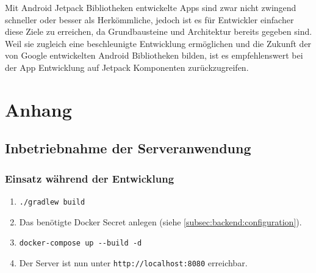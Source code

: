 \documentclass[a4paper, 11pt]{article}
\begin{document}
Mit Android Jetpack Bibliotheken entwickelte Apps sind zwar nicht zwingend schneller oder besser als Herkömmliche, jedoch ist es für Entwickler einfacher diese Ziele zu erreichen, da Grundbausteine und Architektur bereits gegeben sind.
Weil sie zugleich eine beschleunigte Entwicklung ermöglichen und die Zukunft der von Google entwickelten Android Bibliotheken bilden, ist es empfehlenswert bei der App Entwicklung auf Jetpack Komponenten zurückzugreifen.

\newpage
\begingroup
\raggedright
\printbibliography[title={Referenzen}, keyword=citations]
\nocite{*}
\newrefcontext[sorting=nty]
\printbibliography[title={Dokumentationen}, keyword=sources, env=sources]
\endgroup

\newpage
\section*{Anhang}
\label{sec:attachments}

\subsection*{Inbetriebnahme der Serveranwendung}
\label{subsec:attachments:instructions}

\subsubsection*{Einsatz während der Entwicklung}
\label{subsubsec:attachments:instructions:development}
\begin{enumerate}
	\item \verb|./gradlew build|
	\item Das benötigte Docker Secret anlegen (siehe \autoref{subsec:backend:configuration}).
	\item \verb|docker-compose up --build -d|
	\item Der Server ist nun unter \verb|http://localhost:8080| erreichbar.
\end{enumerate}
\end{document}
